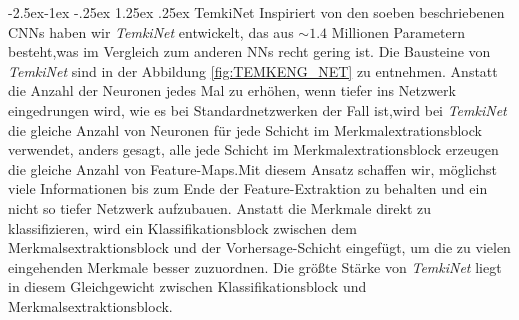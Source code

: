 \documentclass[12pt,a4paper]{scrartcl}
\makeatletter
\numberwithin{equation}{section}
\renewcommand\paragraph{\@startsection{paragraph}{4}{\z@}%
	{-2.5ex\@plus -1ex \@minus -.25ex}%
	{1.25ex \@plus .25ex}%
	{\normalfont\normalsize\bfseries}}
\makeatother
\begin{document}
\paragraph{TemkiNet}\label{exp:TEMKI}
Inspiriert von den soeben beschriebenen \acsp{CNN} haben wir \textit{TemkiNet} entwickelt, das aus $ \sim1.4 $ Millionen Parametern besteht,was im Vergleich zum anderen \acsp{NN} recht gering ist. Die Bausteine von \textit{TemkiNet} sind in der Abbildung \ref{fig:TEMKENG_NET} zu entnehmen.
Anstatt die Anzahl der Neuronen jedes Mal zu erhöhen, wenn tiefer ins Netzwerk eingedrungen wird, wie es bei Standardnetzwerken der Fall ist,wird bei \textit{TemkiNet} die gleiche Anzahl von Neuronen für jede Schicht im Merkmalextrationsblock verwendet, anders gesagt, alle jede Schicht im Merkmalextrationsblock erzeugen die gleiche Anzahl von Feature-Maps.Mit diesem Ansatz schaffen wir, möglichst viele Informationen bis zum Ende der Feature-Extraktion zu behalten und ein nicht so tiefer Netzwerk aufzubauen. Anstatt die Merkmale direkt zu klassifizieren, wird ein Klassifikationsblock zwischen dem Merkmalsextraktionsblock und der Vorhersage-Schicht eingefügt, um die zu vielen eingehenden Merkmale besser zuzuordnen. Die größte Stärke von \textit{TemkiNet} liegt in diesem Gleichgewicht zwischen Klassifikationsblock und Merkmalsextraktionsblock.
\end{document}
